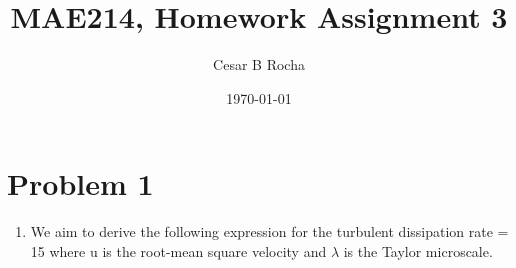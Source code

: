 \documentclass[11pt]{article}
\title{MAE214, Homework Assignment 3}
\author{Cesar B Rocha}
\date{\today}
\begin{document}


\maketitle

\section*{Problem 1}

\begin{enumerate}[label=(\alph*)]

    \item We aim to derive the following expression for the turbulent dissipation rate
        \beq
            \label{eq:ep_target}
            \epsilon = 15 \nu {}\com
        \eeq
        where u is the root-mean square velocity and $\lambda$ is the Taylor microscale. 


\end{enumerate}
\end{document}
